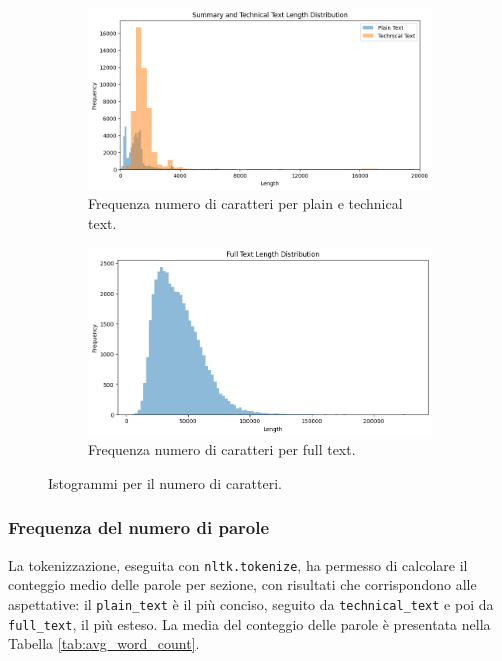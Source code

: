 \documentclass[12pt,a4paper,twoside,openright]{book}
\begin{document}
\begin{figure}
    \centering
    \begin{subfigure}[b]{0.89\textwidth}
        \includegraphics[width=\textwidth]{images/sum_tech_length_distrib.png}
        \caption{Frequenza numero di caratteri per plain e technical text.}
        \label{fig:hist_tech_plain}
    \end{subfigure}
\quad
    \begin{subfigure}[b]{0.85\textwidth}
        \includegraphics[width=\textwidth]{images/full_length_distrib.png}
        \caption{Frequenza numero di caratteri per full text.}
        \label{fig:hist_full}
    \end{subfigure}
    \caption{Istogrammi per il numero di caratteri.}
\end{figure}


\subsubsection{Frequenza del numero di parole}
La tokenizzazione, eseguita con \texttt{nltk.tokenize}, ha permesso di calcolare il conteggio medio delle parole per sezione, con risultati che corrispondono alle aspettative: il \texttt{plain\_text} è il più conciso, seguito da \texttt{technical\_text} e poi da \texttt{full\_text}, il più esteso. La media del conteggio delle parole è presentata nella Tabella \ref{tab:avg_word_count}.
\end{document}

